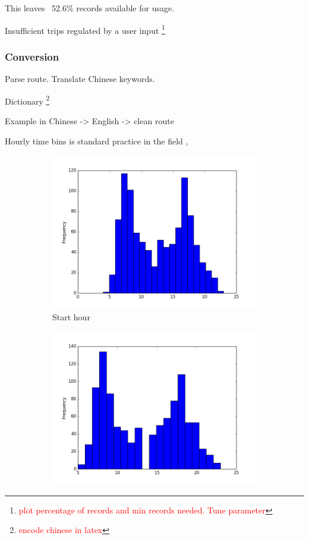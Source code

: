 \documentclass{article}
\newcommand{\selfnote}[1]{\footnote{\textcolor{red}{#1}}}
\begin{document}
This leaves ~52.6\% records available for usage. 

Insufficient trips regulated by a user input \selfnote{plot percentage of records and min records needed. Tune parameter}

\subsubsection{Conversion}
Parse route. Translate Chinese keywords. 

Dictionary \selfnote{encode chinese in latex}

Example in Chinese -> English -> clean route

Hourly time bins is standard practice in the field \cite{langlois2016inferring} \cite{ma2017understanding}, 

\begin{figure}[H]
  \centering
  \begin{subfigure}[b]{.45\textwidth}
  	\centering
  	\includegraphics[width=\linewidth]{./images/start_hour_hist.png}
  	\caption{Start hour}
  \end{subfigure}
  \begin{subfigure}[b]{.45\textwidth}
  	\centering
  	\includegraphics[width=\linewidth]{./images/end_hour_hist.png}

\end{subfigure}
\end{figure}
\end{document}
